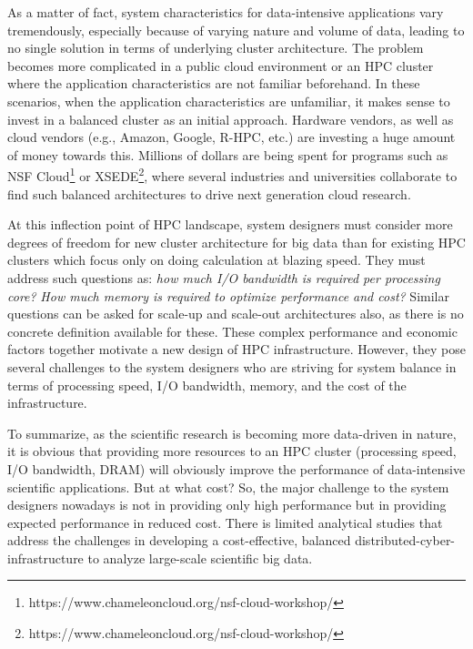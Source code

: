 \documentclass[journal]{IEEEtran}
\begin{document}
As a matter of fact, system characteristics for data-intensive applications vary tremendously, especially because of varying nature and volume of data, leading to no single solution in terms of underlying cluster architecture. The problem becomes more complicated in a public cloud environment or an HPC cluster where the application characteristics are not familiar beforehand. In these scenarios, when the application characteristics are unfamiliar, it makes sense to invest in a balanced cluster as an initial approach. Hardware vendors, as well as cloud vendors (e.g., Amazon, Google, R-HPC, etc.) are investing a huge amount of money towards this. Millions of dollars are being spent for programs such as NSF Cloud\footnote{https://www.chameleoncloud.org/nsf-cloud-workshop/} or XSEDE\footnote{https://www.chameleoncloud.org/nsf-cloud-workshop/}, where several industries and universities collaborate to find such balanced architectures to drive next generation cloud research. 

At this inflection point of HPC landscape, system designers must consider more degrees of freedom for new cluster architecture for big data than for existing HPC clusters which focus only on doing calculation at blazing speed. They must address such questions as: \textit{how much I/O bandwidth is required per processing core?} \textit{How much memory is required to optimize performance and cost?}  Similar questions can be asked for scale-up and scale-out architectures also, as there is no concrete definition available for these. These complex performance and economic factors together motivate a new design of HPC infrastructure. However, they pose several challenges to the system designers who are striving for system balance in terms of processing speed, I/O bandwidth, memory, and the cost of the infrastructure. 

To summarize, as the scientific research is becoming more data-driven in nature, it is obvious that providing more resources to an HPC cluster (processing speed, I/O bandwidth, DRAM)  will obviously improve the performance of data-intensive scientific applications. But at what cost? So, the major challenge to the system designers nowadays is not in providing only high performance but in providing expected performance in reduced cost. There is limited analytical studies that address the challenges in developing a cost-effective, balanced distributed-cyber-infrastructure to analyze large-scale scientific big data.
 
\end{document}
